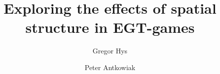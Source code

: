 \documentclass{article}
\title{Exploring the effects of spatial structure in EGT-games}
\author{Gregor Hys \and Peter Antkowiak}
\begin{document}
\maketitle











\newpage

\twocolumn
\sloppy















\onecolumn

\newpage
\newpage



\end{document}
